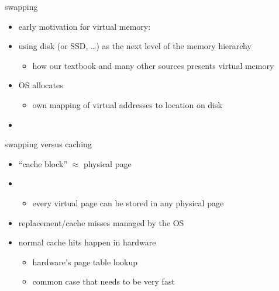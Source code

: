 \begin{frame}{swapping}
\begin{itemize}
    \item early motivation for virtual memory: 
\item using disk (or SSD, \ldots) as the next level of the memory hierarchy
\begin{itemize}
    \item how our textbook and many other sources presents virtual memory
\end{itemize}
\vspace{.5cm}
\item OS allocates 
    \begin{itemize}
    \item own mapping of virtual addresses to location on disk
    \end{itemize}
\item {}
\end{itemize}
\end{frame}

\begin{frame}{swapping versus caching}
\begin{itemize}
    \item ``cache block'' $\approx$ physical page
    \item {}
        \begin{itemize}
        \item every virtual page can be stored in any physical page
        \end{itemize}
    \item replacement/cache misses managed by the OS
    \item normal cache hits happen in hardware
        \begin{itemize}
        \item hardware's page table lookup
        \item common case that needs to be very fast
        \end{itemize}
\end{itemize}
\end{frame}

